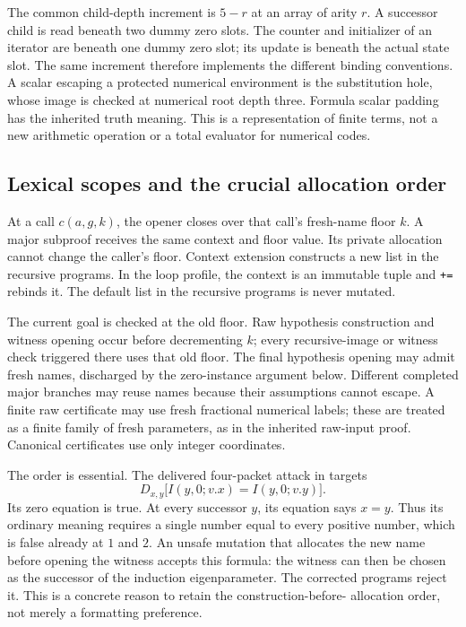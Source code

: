 The common child-depth increment is $5-r$ at an array of arity $r$.
A successor child is read beneath two dummy zero slots. The counter
and initializer of an iterator are beneath one dummy zero slot; its
update is beneath the actual state slot. The same increment therefore
implements the different binding conventions. A scalar escaping a
protected numerical environment is the substitution hole, whose image
is checked at numerical root depth three. Formula scalar padding has
the inherited truth meaning. This is a representation of finite terms,
not a new arithmetic operation or a total evaluator for numerical codes.

\subsection{Lexical scopes and the crucial allocation order}
At a call $c(a,g,k)$, the opener closes over that call's fresh-name floor
$k$. A major subproof receives the same context and floor value. Its
private allocation cannot change the caller's floor. Context extension
constructs a new list in the recursive programs. In the loop profile,
the context is an immutable tuple and \texttt{+=} rebinds it. The default
list in the recursive programs is never mutated.

The current goal is checked at the old floor. Raw hypothesis construction
and witness opening occur before decrementing $k$; every recursive-image
or witness check triggered there uses that old floor. The final hypothesis
opening may admit fresh names, discharged by the zero-instance argument
below. Different completed major
branches may reuse names because their assumptions cannot escape. A
finite raw certificate may use fresh fractional numerical labels; these
are treated as a finite family of fresh parameters, as in the inherited
raw-input proof. Canonical certificates use only integer coordinates.

The order is essential. The delivered four-packet attack in
 targets
\[
 D_{x,y}\bigl[I(y,0;v.x)=I(y,0;v.y)\bigr].
\]
Its zero equation is true. At every successor $y$, its equation says
$x=y$. Thus its ordinary meaning requires a single number equal to
every positive number, which is false already at $1$ and $2$.
An unsafe mutation that allocates the new name before opening the
witness accepts this formula: the witness can then be chosen as the
successor of the induction eigenparameter. The corrected programs
reject it. This is a concrete reason to retain the construction-before-
allocation order, not merely a formatting preference.

